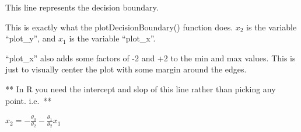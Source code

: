 \documentclass[
]{book}
\newenvironment{Shaded}{\begin{snugshade}}{\end{snugshade}}
\newcommand{\DataTypeTok}[1]{\textcolor[rgb]{0.13,0.29,0.53}{#1}}
\newcommand{\DecValTok}[1]{\textcolor[rgb]{0.00,0.00,0.81}{#1}}
\newcommand{\KeywordTok}[1]{\textcolor[rgb]{0.13,0.29,0.53}{\textbf{#1}}}
\newcommand{\NormalTok}[1]{#1}
\newcommand{\OperatorTok}[1]{\textcolor[rgb]{0.81,0.36,0.00}{\textbf{#1}}}
\newcommand{\StringTok}[1]{\textcolor[rgb]{0.31,0.60,0.02}{#1}}
\begin{document}
This line represents the decision boundary.

This is exactly what the plotDecisionBoundary() function does. \(x_2\) is the variable ``plot\_y'', and \(x_1\) is the variable ``plot\_x''.

``plot\_x'' also adds some factors of -2 and +2 to the min and max values. This is just to visually center the plot with some margin around the edges.

** In R you need the intercept and slop of this line rather than picking any point. i.e.~**

\(x_2 = -\frac{\theta_0 }{\theta_2} - \frac{\theta_1}{\theta_2}x_1\)

\begin{Shaded}
\end{Shaded}
\end{document}
